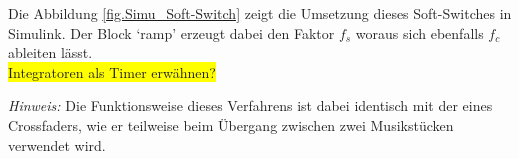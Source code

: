 Die Abbildung \ref{fig.Simu_Soft-Switch} zeigt die Umsetzung dieses Soft-Switches in Simulink. Der Block `ramp' erzeugt dabei den Faktor $f_s$ woraus sich ebenfalls $f_c$ ableiten lässt. \\
\colorbox{yellow}{Integratoren als Timer erwähnen?}

\textit{Hinweis:} Die Funktionsweise dieses Verfahrens ist dabei identisch mit der eines Crossfaders, wie er teilweise beim Übergang zwischen zwei Musikstücken verwendet wird.


